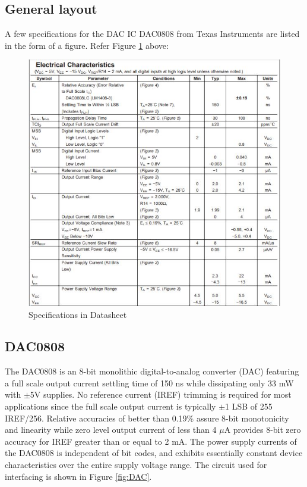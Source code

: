\documentclass[12pt, letterpaper]{article}
\begin{document}
\subsection{General layout}
A few specifications for the DAC IC DAC0808 from Texas Instruments are listed in the form of a figure. Refer Figure \ref{fig:specs} above:
\begin{figure}[t]
	\centering
	\includegraphics[scale=0.75]{Datasheet_DAC0808.JPG}
	\caption{Specifications in Datasheet}
	\label{fig:specs}
\end{figure}

\subsection{DAC0808}

The DAC0808 is an 8-bit monolithic digital-to-analog converter (DAC) featuring a full scale output current settling time of 150 ns while dissipating only 33 mW with $\pm$5V supplies. No reference current (IREF) trimming is required for most applications since the full scale output current is typically $\pm$1 LSB of 255 IREF/256. Relative accuracies of better than 0.19\% assure 8-bit monotonicity and linearity while zero level output current of less than 4 $\mu$A provides 8-bit zero accuracy for IREF greater than or equal to 2 mA. The power supply currents of the DAC0808 is independent of bit codes, and exhibits essentially constant device characteristics over the entire supply voltage range. The circuit used for interfacing is shown in Figure \ref{fig:DAC}.
\end{document}

